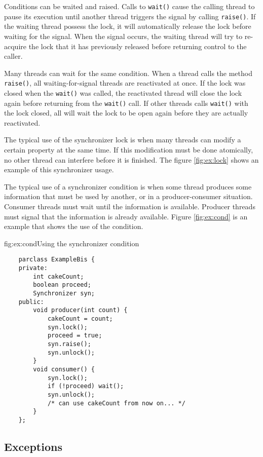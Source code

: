 Conditions can be waited and raised. Calls to \texttt{wait()} cause the
calling thread to pause its execution until another thread triggers the signal
by calling \texttt{raise()}. If the waiting thread possess the lock, it will
automatically release the lock before waiting for the signal. When the signal
occurs, the waiting thread will try to re-acquire the lock that it has previously
released before returning control to the caller. 

Many threads can wait for the same condition. When a thread calls the
method \texttt{raise()}, all waiting-for-signal threads are reactivated at
once. If the lock was closed when the \texttt{wait()} was called, the
reactivated thread will close the lock again before returning from the
\texttt{wait()} call. If other threads calls \texttt{wait()} with the
lock closed, all will wait the lock to be open again before they are
actually reactivated.

The typical use of the synchronizer lock is when many threads can modify
a certain property at the same time. If this modification must be done
atomically, no other thread can interfere before it is finished. The
figure \ref{fig:ex:lock} shows an example of this synchronizer usage.

The typical use of a synchronizer condition is when some thread produces
some information that must be used by another, or in a producer-consumer
situation. Consumer threads must wait until the information is
available. Producer threads must signal that the information is already
available. Figure \ref{fig:ex:cond} is an example that shows the use of
the condition.

\begin{figura}{fig:ex:cond}{Using the synchronizer condition}%
\vspace{-4mm}%
\begin{verbatim}
    parclass ExampleBis {
    private:
        int cakeCount;
        boolean proceed;
        Synchronizer syn;
    public:
        void producer(int count) {
            cakeCount = count;
            syn.lock();
            proceed = true;
            syn.raise();
            syn.unlock();
        }
        void consumer() {
            syn.lock();
            if (!proceed) wait();
            syn.unlock();
            /* can use cakeCount from now on... */
        }
    };
\end{verbatim}
\end{figura}



\subsection{Exceptions} \label{sec:exceptions}


